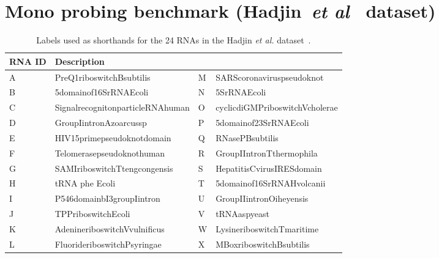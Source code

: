 \documentclass[11pt]{article} %
\begin{document}
\section*{Mono probing benchmark (Hadjin~\emph{et al}~\cite{Hajdin2013} dataset)}

 \begin{table}[H]

{\centering
\begin{adjustbox}{max width=1\textwidth}
 \begin{tabular}{@{}llll@{}}
 	\toprule
 	RNA ID & Description                      \\ \midrule
 	A      & PreQ1riboswitchBsubtilis         & 	M      & SARScoronaviruspseudoknot        \\
 	B      & 5domainof16SrRNAEcoli            & 	N      & 5SrRNAEcoli                      \\
 	C      & SignalrecognitonparticleRNAhuman & 	O      & cyclicdiGMPriboswitchVcholerae   \\
 	D      & GroupIintronAzoarcussp           & 	P      & 5domainof23SrRNAEcoli            \\
 	E      & HIV15primepseudoknotdomain       & 	Q      & RNasePBsubtilis                  \\
 	F      & Telomerasepseudoknothuman        & 	R      & GroupIIntronTthermophila         \\
 	G      & SAMIriboswitchTtengcongensis     & 	S      & HepatitisCvirusIRESdomain        \\
 	H      & tRNA phe Ecoli                   & 	T      & 5domainof16SrRNAHvolcanii        \\
 	I      & P546domainbI3groupIintron        & 	U      & GroupIIintronOiheyensis          \\
 	J      & TPPriboswitchEcoli               & 	V      & tRNAaspyeast                     \\
 	K      & AdenineriboswitchVvulnificus     & 	W      & LysineriboswitchTmaritime        \\
 	L      & FluorideriboswitchPsyringae      & 	X      & MBoxriboswitchBsubtilis          \\
 	\bottomrule
 \end{tabular}
\end{adjustbox}\\}

\caption{Labels used as shorthands for the 24 RNAs in the Hadjin \emph{ et al.} dataset~\cite{Hajdin2013}.}
\label{clyu}

\end{table}
\end{document}

